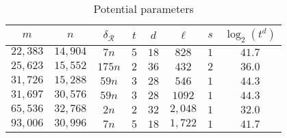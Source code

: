\begin{table}
  \centering
  \begin{tabular}{||c|c|c||ccccc||}
    \hline
    $m$ & $n$ & $\delta_\mathcal{R}$ & $t$ & $d$ & $\ell$ & $s$ & $\log_2(t^d)$ \\
    \hline
    $22,383$ & $14,904$ & $7n$ & $5$  & $18$ & $828$  & $1$ &  $41.7$ \\
    $25,623$ & $15,552$ & $175n$ & $2$ & $36$ & $432$ & $2$ & $36.0$ \\
    $31,726$ & $15,288$ & $59n$ & $3$ & $28$ & $546$ & $1$ & $44.3$ \\
    \hline
    $31,697$ & $30,576$ & $59n$ & $3$ & $28$ & $1092$ & $1$ & $44.3$ \\
    $65,536$ & $32,768$ & $2n$ & $2$ & $32$ & $2,048$ & $1$ & $32.0$ \\
    $93,006$ & $30,996$ & $7n$ & $5$ & $18$ & $1,722$ & $1$ & $41.7$ \\
    \hline
                                                   
  \end{tabular}
  \caption{Potential parameters}
  \label{tab:params}
\end{table}

